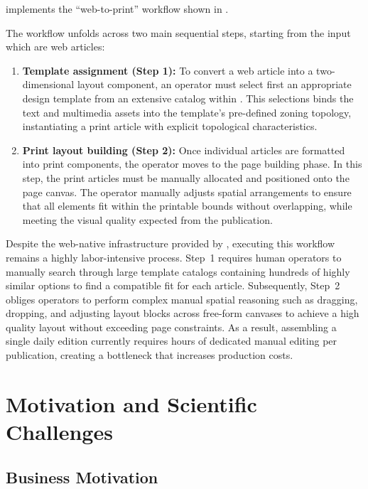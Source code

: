 \melody implements the ``web-to-print'' workflow shown in .

The workflow unfolds across two main sequential steps, starting from the input which are web articles:

\begin{enumerate}    
    \item \textbf{Template assignment (Step 1):} To convert a  web article into a two-dimensional layout component, an operator must select first an appropriate design template  from an extensive catalog  within \melody. This selections binds the text and multimedia assets into the template's pre-defined zoning topology, instantiating a print article  with explicit topological characteristics.
    
    \item \textbf{Print layout building (Step 2):} Once individual articles are formatted into print components, the operator moves to the page building phase. In this step, the print articles must be manually allocated and positioned onto the  page canvas. The operator manually adjusts spatial arrangements to ensure that all elements fit within the printable bounds without overlapping, while meeting the visual quality expected from the publication.
\end{enumerate}

Despite the web-native infrastructure provided by \melody, executing this workflow remains a highly labor-intensive process. Step~1 requires human operators to manually search through large template catalogs containing hundreds of highly similar options to find a compatible fit for each article. Subsequently, Step~2 obliges operators to perform complex manual spatial reasoning such as dragging, dropping, and adjusting layout blocks across free-form canvases to achieve a high quality layout without exceeding page constraints. As a result, assembling a single daily edition currently requires hours of dedicated manual editing per publication, creating a bottleneck that increases production costs.


\section{Motivation and Scientific Challenges}
\label{sec:motivation}

\subsection{Business Motivation}

